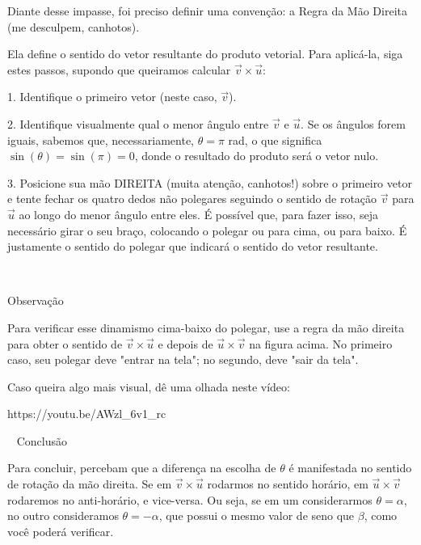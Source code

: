 Diante desse impasse, foi preciso definir uma convenção: a Regra da Mão Direita (me desculpem, canhotos).

Ela define o sentido do vetor resultante do produto vetorial. Para aplicá-la, siga estes passos, supondo que queiramos calcular \(\vec{v} \times \vec{u}\):

1. Identifique o primeiro vetor (neste caso, \(\vec{v}\)).

2. Identifique visualmente qual o menor ângulo entre \(\vec{v}\) e \(\vec{u}\). Se os ângulos forem iguais, sabemos que, necessariamente, \(\theta = \pi\) rad, o que significa \(\sin(\theta) = \sin(\pi) = 0\), donde o resultado do produto será o vetor nulo.

3. Posicione sua mão DIREITA (muita atenção, canhotos!) sobre o primeiro vetor e tente fechar os quatro dedos não polegares seguindo o sentido de rotação \(\vec{v}\) para \(\vec{u}\) ao longo do menor ângulo entre eles. É possível que, para fazer isso, seja necessário girar o seu braço, colocando o polegar ou para cima, ou para baixo. É justamente o sentido do polegar que indicará o sentido do vetor resultante.

 

Observação

Para verificar esse dinamismo cima-baixo do polegar, use a regra da mão direita para obter o sentido de \(\vec{v} \times \vec{u}\) e depois de \(\vec{u} \times \vec{v}\) na figura acima. No primeiro caso, seu polegar deve "entrar na tela"; no segundo, deve "sair da tela".

Caso queira algo mais visual, dê uma olhada neste vídeo:

https://youtu.be/AWzl_6v1_rc

 
Conclusão

Para concluir, percebam que a diferença na escolha de \(\theta\) é manifestada no sentido de rotação da mão direita. Se em \(\vec{v} \times \vec{u}\) rodarmos no sentido horário, em \(\vec{u} \times \vec{v}\) rodaremos no anti-horário, e vice-versa. Ou seja, se em um considerarmos \(\theta = \alpha\), no outro consideramos \(\theta = -\alpha\), que possui o mesmo valor de seno que \(\beta\), como você poderá verificar. 